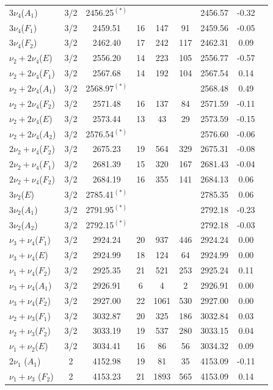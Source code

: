 \begin{longtable}{lcccccccc}
$3\nu_4$($A_1$) & 3/2 & 2456.25$^{(*)}$ &  &  &  & 2456.57 & -0.32 & \cite{874} \\
$3\nu_4$($F_1$) & 3/2 & 2459.51 & 16 & 147 & 91 & 2459.56 & -0.05 & \cite{874} \\
$3\nu_4$($F_2$) & 3/2 & 2462.40 & 17 & 242 & 117 & 2462.31 & 0.09 & \cite{874} \\
$\nu_2+2\nu_4$($E$) & 3/2 & 2556.20 & 14 & 223 & 105 & 2556.77 & -0.57 & \cite{874} \\
$\nu_2+2\nu_4$($F_1$) & 3/2 & 2567.68 & 14 & 192 & 104 & 2567.54 & 0.14 & \cite{874} \\
$\nu_2+2\nu_4$($A_1$) & 3/2 & 2568.97$^{(*)}$ &  &  &  & 2568.48 & 0.49 & \cite{874} \\
$\nu_2+2\nu_4$($F_2$) & 3/2 & 2571.48 & 16 & 137 & 84 & 2571.59 & -0.11 & \cite{874} \\
$\nu_2+2\nu_4$($E$) & 3/2 & 2573.44 & 13 & 43 & 29 & 2573.59 & -0.15 & \cite{874} \\
$\nu_2+2\nu_4$($A_2$) & 3/2 & 2576.54$^{(*)}$ &  &  &  & 2576.60 & -0.06 & \cite{874} \\
$2\nu_2+\nu_4$($F_2$) & 3/2 & 2675.23 & 19 & 564 & 329 & 2675.31 & -0.08 & \cite{874} \\
$2\nu_2+\nu_4$($F_1$) & 3/2 & 2681.39 & 15 & 320 & 167 & 2681.43 & -0.04 & \cite{874} \\
$2\nu_2+\nu_4$($F_2$) & 3/2 & 2684.19 & 16 & 355 & 141 & 2684.13 & 0.06 & \cite{874} \\
$3\nu_2$($E$) & 3/2 & 2785.41$^{(*)}$ &  &  &  & 2785.35 & 0.06 & \cite{874} \\
$3\nu_2$($A_1$) & 3/2 & 2791.95$^{(*)}$ &  &  &  & 2792.18 & -0.23 & \cite{874} \\
$3\nu_2$($A_2$) & 3/2 & 2792.15$^{(*)}$ &  &  &  & 2792.18 & -0.03 & \cite{874} \\
$\nu_3+\nu_4$($F_1$) & 3/2 & 2924.24 & 20 & 937 & 446 & 2924.24 & 0.00 & \cite{875} \\
$\nu_3+\nu_4$($E  $) & 3/2 & 2924.99 & 18 & 124 & 64 & 2924.99 & 0.00 & \cite{875} \\
$\nu_1+\nu_4$($F_2$) & 3/2 & 2925.35 & 21 & 521 & 253 & 2925.24 & 0.11 & \cite{875} \\
$\nu_3+\nu_4$($A_1$) & 3/2 & 2926.91 & 6 & 4 & 2 & 2926.91 & 0.00 & \cite{875} \\
$\nu_3+\nu_4$($F_2$) & 3/2 & 2927.00 & 22 & 1061 & 530 & 2927.00 & 0.00 & \cite{875} \\
$\nu_2+\nu_3$($F_1$) & 3/2 & 3032.87 & 20 & 325 & 186 & 3032.84 & 0.03 & \cite{875} \\
$\nu_2+\nu_3$($F_2$) & 3/2 & 3033.19 & 19 & 537 & 280 & 3033.15 & 0.04 & \cite{875} \\
$\nu_1+\nu_2$($E  $) & 3/2 & 3034.41 & 16 & 86 & 56 & 3034.32 & 0.09 & \cite{875} \\
$2\nu_1$ ($A_1$) & 2 & 4152.98 & 19 & 81 & 35 & 4153.09 & -0.11 & \cite{876} \\
$\nu_1+\nu_3$ ($F_2$) & 2 & 4153.23 & 21 & 1893 & 565 & 4153.09 & 0.14 & \cite{876} \\
\end{longtable}

